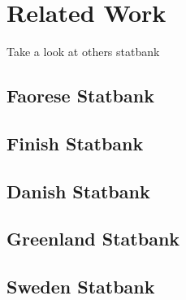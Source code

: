 
\chapter{Related Work} %

\label{ch:relatedwork} %




Take a look at others statbank
\section{Faorese Statbank}
\section{Finish Statbank}
\section{Danish Statbank}
\section{Greenland Statbank}
\section{Sweden Statbank}